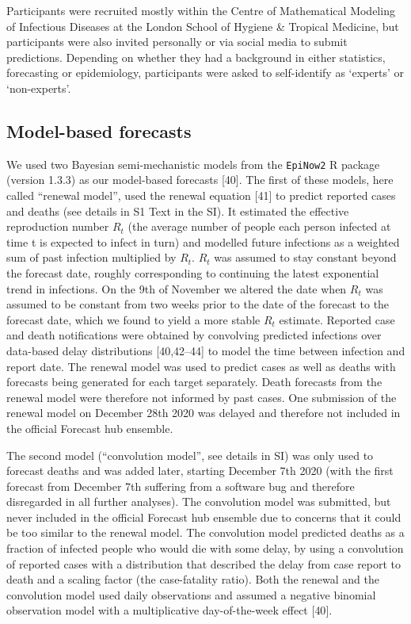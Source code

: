 \documentclass[10pt,letterpaper]{article}
\begin{document}
Participants were recruited mostly within the Centre of Mathematical
Modeling of Infectious Diseases at the London School of Hygiene \&
Tropical Medicine, but participants were also invited personally or via
social media to submit predictions. Depending on whether they had a
background in either statistics, forecasting or epidemiology,
participants were asked to self-identify as `experts' or `non-experts'.

\hypertarget{model-based-forecasts}{%
\subsection{Model-based forecasts}\label{model-based-forecasts}}

We used two Bayesian semi-mechanistic models from the \texttt{EpiNow2} R
package (version 1.3.3) as our model-based forecasts {[}40{]}. The first
of these models, here called ``renewal model'', used the renewal
equation {[}41{]} to predict reported cases and deaths (see details in
S1 Text in the SI). It estimated the effective reproduction number
\(R_t\) (the average number of people each person infected at time t is
expected to infect in turn) and modelled future infections as a weighted
sum of past infection multiplied by \(R_t\). \(R_t\) was assumed to stay
constant beyond the forecast date, roughly corresponding to continuing
the latest exponential trend in infections. On the 9th of November we
altered the date when \(R_t\) was assumed to be constant from two weeks
prior to the date of the forecast to the forecast date, which we found
to yield a more stable \(R_t\) estimate. Reported case and death
notifications were obtained by convolving predicted infections over
data-based delay distributions {[}40,42--44{]} to model the time between
infection and report date. The renewal model was used to predict cases
as well as deaths with forecasts being generated for each target
separately. Death forecasts from the renewal model were therefore not
informed by past cases. One submission of the renewal model on December
28th 2020 was delayed and therefore not included in the official
Forecast hub ensemble.

The second model (``convolution model'', see details in SI) was only
used to forecast deaths and was added later, starting December 7th 2020
(with the first forecast from December 7th suffering from a software bug
and therefore disregarded in all further analyses). The convolution
model was submitted, but never included in the official Forecast hub
ensemble due to concerns that it could be too similar to the renewal
model. The convolution model predicted deaths as a fraction of infected
people who would die with some delay, by using a convolution of reported
cases with a distribution that described the delay from case report to
death and a scaling factor (the case-fatality ratio). Both the renewal
and the convolution model used daily observations and assumed a negative
binomial observation model with a multiplicative day-of-the-week effect
{[}40{]}.
\end{document}
